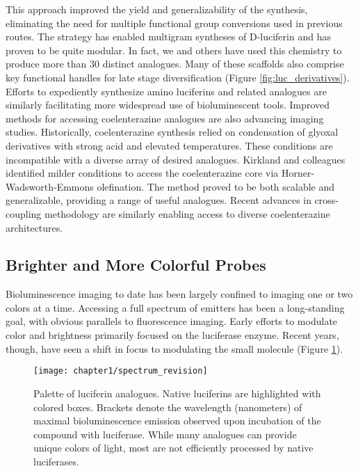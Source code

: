This approach improved the yield and generalizability of
the synthesis, eliminating the need for multiple functional
group conversions used in previous routes. The strategy has
enabled multigram syntheses of D-luciferin and has proven to
be quite modular. In fact, we and others have used this
chemistry to produce more than 30 distinct analogues.\cite{Woodroofe:2012vx} Many
of these scaffolds also comprise key functional handles for late stage
diversification (Figure \ref{fig:luc_derivatives}). Efforts to expediently
synthesize amino luciferins\cite{Hauser:2016jt} and related analogues\cite{Anderson:2017hb} are similarly
facilitating more widespread use of bioluminescent tools.
Improved methods for accessing coelenterazine analogues
are also advancing imaging studies. Historically, coelenterazine
synthesis relied on condensation of glyoxal derivatives with
strong acid and elevated temperatures. These conditions are
incompatible with a diverse array of desired analogues. Kirkland
and colleagues identified milder conditions to access the
coelenterazine core via Horner-Wadsworth-Emmons olefination.\cite{Shakhmin:2016bd}
The method proved to be both scalable and generalizable,
providing a range of useful analogues. Recent advances
in cross-coupling methodology are similarly enabling access to
diverse coelenterazine architectures.\cite{Hosoya:2015iu}
\subsection*{Brighter and More Colorful Probes}
Bioluminescence imaging to date has been largely confined to imaging one or
two colors at a time. Accessing a full spectrum of emitters has
been a long-standing goal, with obvious parallels to
fluorescence imaging. Early efforts to modulate color and
brightness primarily focused on the luciferase enzyme.\cite{RN26} Recent
years, though, have seen a shift in focus to modulating the small
molecule (Figure \ref{fig:luc_spectrum}).

\begin{figure}[htbp]
\texttt{[image: chapter1/spectrum\_revision]}
\centering
\caption{Palette of luciferin analogues. Native luciferins are highlighted with colored boxes. Brackets denote the wavelength (nanometers) of
maximal bioluminescence emission observed upon incubation of the compound with luciferase. While many analogues can provide unique colors of
light, most are not efficiently processed by native luciferases.}
  \label{fig:luc_spectrum}
\end{figure}

